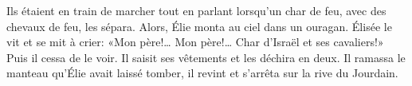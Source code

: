 Ils étaient en train de marcher tout en parlant
	lorsqu’un char de feu, avec des chevaux de feu, les sépara.
	Alors, Élie monta au ciel dans un ouragan.
Élisée le vit et se mit à crier:
	«Mon père!… Mon père!… Char d’Israël et ses cavaliers!»
	Puis il cessa de le voir.
Il saisit ses vêtements et les déchira en deux.
Il ramassa le manteau qu’Élie avait laissé tomber,
	il revint et s’arrêta sur la rive du Jourdain.
